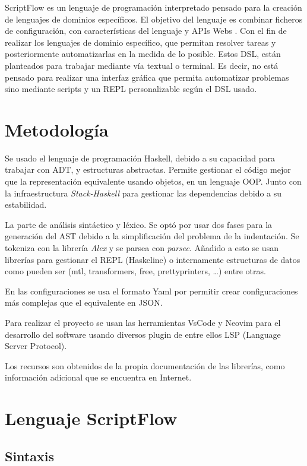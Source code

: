 \documentclass[11pt]{article}
\begin{document}
ScriptFlow es un lenguaje de programación interpretado pensado para la creación de lenguajes de dominios específicos. El objetivo del
lenguaje es combinar ficheros de configuración, con características del lenguaje y APIs Webs . Con el fin de realizar los lenguajes de dominio específico,
que permitan resolver tareas y posteriormente automatizarlas en la medida de lo posible. Estos DSL, están planteados
para trabajar mediante vía textual o terminal. Es decir, no está pensado para realizar una interfaz gráfica que permita automatizar problemas sino mediante
scripts y un REPL personalizable según el DSL usado.

\section{Metodología}
\label{sec:org5e44e37}

Se usado el lenguaje de programación Haskell, debido a su capacidad para trabajar con ADT, y estructuras abstractas. Permite gestionar
el código mejor que la representación equivalente usando objetos, en un
lenguaje OOP. Junto con la infraestructura \emph{Stack-Haskell} para
gestionar las dependencias debido a su estabilidad.

La parte de análisis sintáctico y léxico. Se optó por usar dos fases para la generación del AST
debido a la simplificación del problema de la indentación. Se tokeniza con la librería \emph{Alex} y se parsea con \emph{parsec}.
Añadido a esto se usan librerías para gestionar el REPL (Haskeline) o internamente estructuras de datos como pueden ser (mtl, transformers, free, prettyprinters, \ldots{})
entre otras.

En las configuraciones se usa el formato Yaml por permitir crear configuraciones más complejas que el equivalente en JSON.

Para realizar el proyecto se usan las herramientas VsCode y Neovim para el desarrollo del software usando diversos
plugin de entre ellos LSP (Language Server Protocol).

Los recursos son obtenidos de la propia documentación de las librerías, como información adicional que se encuentra en Internet.

\section{Lenguaje ScriptFlow}
\label{sec:org37e13ce}

\subsection{Sintaxis}
\label{sec:orgd39e951}
\end{document}
